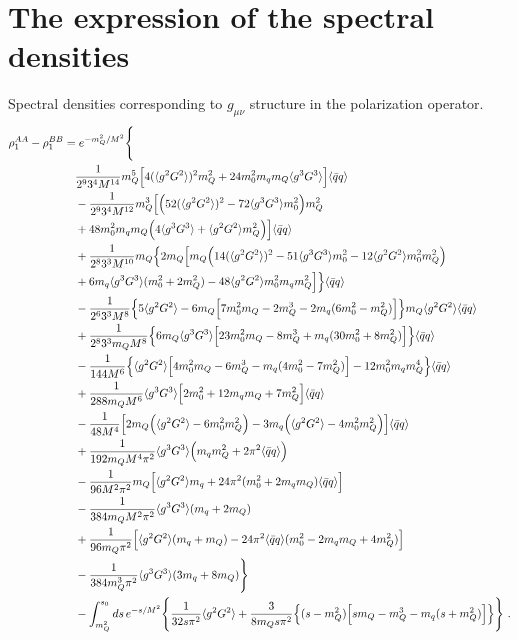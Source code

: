 \documentclass[prd,a4paper,preprint,preprintnumbers,nofootinbib,superscriptaddress]{revtex4-2}
\def\gGthree{\langle g^3 G^3 \rangle}
\def\gGfour{(\langle g^2 G^2 \rangle)^2}
\begin{document}





\newpage

\appendix*
\section{The expression of the spectral densities}
\label{app:formulas}
Spectral densities corresponding to {\boldmath$g_{\mu\nu}$} structure in the polarization operator.
%
\begin{equation}
\begin{aligned}
\rho_1^{AA} - \rho_1^{BB} &= e^{-m_Q^2/M^2} \Bigg\{ \\
&\quad  \frac{1}{2^9 3^4 M^{14}} m_Q^5 \Big[  
 4 \gGfour m_Q^2 + 24 m_0^2 m_q m_Q \gGthree \Big] \qq \\
&\quad - \frac{1}{2^9 3^4 M^{12}} m_Q^3 \Big[ 
\Big( 52 \gGfour - 72 \gGthree m_0^2 \Big) m_Q^2 \\
&\quad + 48 m_0^2 m_q m_Q \Big( 4 \gGthree + \gGgG m_Q^2 \Big) \Big] \qq \\
&\quad + \frac{1}{2^8 3^3 M^{10}} m_Q \Big\{ 
2 m_Q \Big[ m_Q \Big( 14 \gGfour - 51 \gGthree m_0^2 -
12 \gGgG m_0^2 m_Q^2 \Big) \\
&\quad + 6 m_q \gGthree (m_0^2 + 2 m_Q^2)  
- 48 \gGgG m_0^2 m_q m_Q^2 \Big] \Big\} \qq \\  
&\quad - \frac{1}{2^6 3^3 M^8}
\Big\{ 5 \gGgG - 6 m_Q \Big[ 7 m_0^2 m_Q - 2m_Q^3 -
2 m_q (6 m_0^2 - m_Q^2) \Big] \Big\} m_Q \gGgG \qq \\
&\quad + \frac{1}{2^8 3^3 m_Q M^8} \Big\{ 
6 m_Q \gGthree \Big[ 23 m_0^2 m_Q - 8 m_Q^3 + m_q (30 m_0^2 + 8 m_Q^2) \Big] \Big\} \qq \\ 
&\quad - \frac{1}{144 M^6}
\Big\{ \gGgG \Big[ 4 m_0^2 m_Q - 6m_Q^3 -
m_q (4 m_0^2 - 7 m_Q^2) \Big] - 12 m_0^2 m_q m_Q^4 \Big\} \qq \\
&\quad + \frac{1}{288 m_Q M^6} \gGthree \Big[ 2 m_0^2 + 12 m_q m_Q + 7 m_Q^2 \Big] \qq \\
&\quad - \frac{1}{48 M^4} 
\Big[ 2m_Q \Big(\gGgG - 6 m_0^2 m_Q^2\Big) - 3 m_q \Big(\gGgG - 4 m_0^2
m_Q^2\Big) \Big] \qq \\
&\quad + \frac{1}{192 m_Q M^4 \pi^2} \gGthree \Big(m_q m_Q^2 + 2 \pi^2 \qq\Big) \\
&\quad - \frac{1}{96 M^2 \pi^2}
m_Q \Big[ \gGgG m_q + 24 \pi^2 (m_0^2 + 2 m_q m_Q) \qq \Big] \\
&\quad - \frac{1}{384 m_Q M^2 \pi^2} \gGthree (m_q + 2 m_Q) \\
&\quad + \frac{1}{96 m_Q \pi^2}
\Big[ \gGgG (m_q + m_Q) - 24 \pi^2 \qq (m_0^2 - 2 m_q m_Q + 4 m_Q^2) \Big] \\
&\quad - \frac{1}{384 m_Q^3 \pi^2} \gGthree (3 m_q + 8 m_Q)
\Bigg\} \\
&\quad - \int_{m_Q^2}^{s_0} ds\,
e^{-s/M^2} \Bigg\{
\frac{1}{32 s \pi^2} \gGgG +
\frac{3}{8 m_Q s \pi^2} \Big\{ (s - m_Q^2) \Big[ s m_Q - m_Q^3 - m_q (s + m_Q^2) \Big] \Big\} 
\Bigg\}~.
\end{aligned}
\end{equation}
\end{document}
